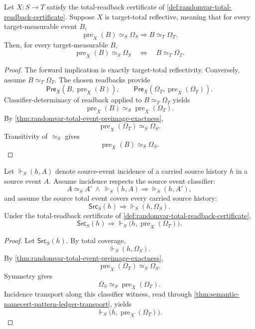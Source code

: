 \begin{theorem}
\label{thm:randomvar-total-target-reflection-criterion}
Let $X:S\to T$ satisfy the total-readback certificate of \autoref{def:randomvar-total-readback-certificate}. Suppose $X$ is target-total reflective, meaning that for every target-measurable event $B$,
$$
\operatorname{pre}_X(B)\simeq_S\Omega_S
\Longrightarrow
B\simeq_T\Omega_T.
$$
Then, for every target-measurable $B$,
$$
\operatorname{pre}_X(B)\simeq_S\Omega_S
\quad\Longleftrightarrow\quad
B\simeq_T\Omega_T.
$$
\end{theorem}
\begin{proof}
The forward implication is exactly target-total reflectivity.
Conversely, assume $B\simeq_T\Omega_T$. The chosen readbacks provide
$$
\mathsf{Pre}_X(B,\operatorname{pre}_X(B)),
\qquad
\mathsf{Pre}_X(\Omega_T,\operatorname{pre}_X(\Omega_T)).
$$
Classifier-determinacy of readback applied to $B\simeq_T\Omega_T$ yields
$$
\operatorname{pre}_X(B)\simeq_S\operatorname{pre}_X(\Omega_T).
$$
By \autoref{thm:randomvar-total-event-preimage-exactness},
$$
\operatorname{pre}_X(\Omega_T)\simeq_S\Omega_S.
$$
Transitivity of $\simeq_S$ gives
$$
\operatorname{pre}_X(B)\simeq_S\Omega_S.
$$
\end{proof}

\begin{theorem}
\label{thm:randomvar-source-coverage-induced-by-total-event-exactness}
Let $\Vdash_S(h,A)$ denote source-event incidence of a carried source history $h$ in a source event $A$. Assume incidence respects the source event classifier:
$$
A\simeq_S A'\ \wedge\ \Vdash_S(h,A)
\Longrightarrow
\Vdash_S(h,A'),
$$
and assume the source total event covers every carried source history:
$$
\mathsf{Src}_S(h)\Longrightarrow \Vdash_S(h,\Omega_S).
$$
Under the total-readback certificate of \autoref{def:randomvar-total-readback-certificate},
$$
\mathsf{Src}_S(h)
\Longrightarrow
\Vdash_S\bigl(h,\operatorname{pre}_X(\Omega_T)\bigr).
$$
\end{theorem}
\begin{proof}
Let $\mathsf{Src}_S(h)$. By total coverage,
$$
\Vdash_S(h,\Omega_S).
$$
By \autoref{thm:randomvar-total-event-preimage-exactness},
$$
\operatorname{pre}_X(\Omega_T)\simeq_S\Omega_S.
$$
Symmetry gives
$$
\Omega_S\simeq_S\operatorname{pre}_X(\Omega_T).
$$
Incidence transport along this classifier witness, read through \autoref{thm:semantic-namecert-pattern-ledger-transport}, yields
$$
\Vdash_S\bigl(h,\operatorname{pre}_X(\Omega_T)\bigr).
$$
\end{proof}

